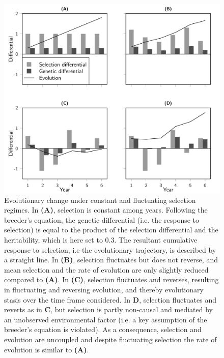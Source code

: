 \begin{figure}
	\includegraphics[width=\textwidth]{FiguresFluSel/concetpualplot-1}
	\caption{Evolutionary change under constant and fluctuating selection regimes. 
	In \textbf{(A)}, selection is constant among years. Following the breeder's equation, the genetic differential (i.e. the response to selection) is equal to the product of the selection differential and the heritability, which is here set to $0.3$. The resultant cumulative response to selection, i.e the evolutionary trajectory, is described by a straight line. 
	In \textbf{(B)}, selection fluctuates but does not reverse, and mean selection and the rate of evolution are only slightly reduced compared to \textbf{(A)}.
	In \textbf{(C)}, selection fluctuates and reverses, resulting in fluctuating and reversing evolution, and thereby evolutionary stasis over the time frame considered. 
	In \textbf{D}, selection fluctuates and reverts as in \textbf{C}, but selection is partly non-causal and mediated by an unobserved environmental factor (i.e. a key assumption of the breeder's equation is violated). As a consequence, selection and evolution are uncoupled and despite fluctuating selection the rate of evolution is similar to \textbf{(A)}.}
	\label{fig:concept}
\end{figure}


